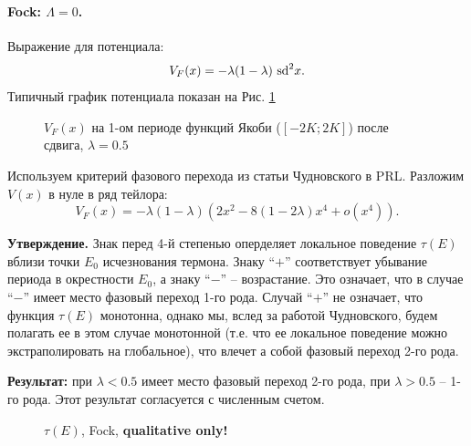 \documentclass[12pt]{article}
\begin{document}
\paragraph{Fock: $\Lambda = 0$.}
Выражение для потенциала:
%
\begin{equation}
V_F (x) = -\lambda (1 - \lambda)~\textrm{sd}^2 x.
\label{eq:potential_fock}
\end{equation}
%
Типичный график потенциала показан на Рис. \ref{pic:potential_fock}
%
\begin{figure}[Ht!]
\caption{$V_F (x)$ на 1-ом периоде функций Якоби ($[-2K; 2K]$) после сдвига, $\lambda = 0.5$}
\label{pic:potential_fock}
\end{figure}
%
Используем критерий фазового перехода из статьи Чудновского в PRL.
Разложим $V(x)$ в нуле в ряд тейлора:
%
\begin{equation}
V_F (x) = -\lambda (1 - \lambda) (2x^2 - 8(1 - 2\lambda)x^4 + o(x^4)).
\end{equation}
%

\textbf{Утверждение.} Знак перед 4-й степенью оперделяет локальное поведение $\tau(E)$ вблизи точки $E_0$ исчезнования термона.
Знаку ``$+$'' соответствует убывание периода в окрестности $E_0$, а знаку ``$-$'' -- возрастание.
Это означает, что в случае ``$-$'' имеет место фазовый переход 1-го рода.
Случай ``$+$'' не означает, что функция $\tau(E)$ монотонна, однако мы, вслед за работой Чудновского, будем полагать ее в этом случае монотонной (т.е. что ее локальное поведение можно экстраполировать на глобальное), что влечет а собой фазовый переход 2-го рода.

\textbf{Результат:} при $\lambda < 0.5$ имеет место фазовый переход 2-го рода, при $\lambda > 0.5$ -- 1-го рода.
Этот результат согласуется с численным счетом.
%
\begin{figure}[Ht!]
\caption{$\tau(E)$, Fock, {\bf qualitative only!}}
\end{figure}
%
\end{document}
